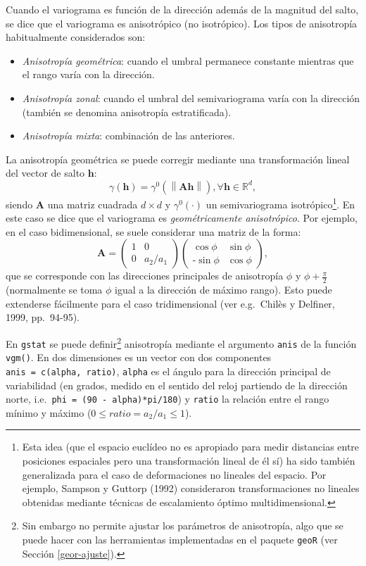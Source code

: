 \documentclass[
]{book}
\providecommand{\tightlist}{%
  \setlength{\itemsep}{0pt}\setlength{\parskip}{0pt}}
\theoremstyle{break}
\theoremstyle{definition}
\theoremstyle{definition}
\theoremstyle{definition}
\theoremstyle{definition}
\theoremstyle{remark}
\begin{document}
Cuando el variograma es función de la dirección además de la magnitud del salto, se dice que el variograma es anisotrópico (no isotrópico).
Los tipos de anisotropía habitualmente considerados son:

\begin{itemize}
\tightlist
\item
  \emph{Anisotropía geométrica}: cuando el umbral permanece constante mientras que el rango varía con la dirección.
\item
  \emph{Anisotropía zonal}: cuando el umbral del semivariograma varía con la dirección (también se denomina anisotropía estratificada).
\item
  \emph{Anisotropía mixta}: combinación de las anteriores.
\end{itemize}

La anisotropía geométrica se puede corregir mediante una transformación lineal del vector de salto \(\mathbf{h}\):
\[\gamma(\mathbf{h})=\gamma^{0} \left( \left\| \mathbf{A}\mathbf{h}\right\| \right) ,\forall \mathbf{h}\in \mathbb{R}^{d},\]
siendo \(\mathbf{A}\) una matriz cuadrada \(d\times d\) y \(\gamma^{0} (\cdot)\) un semivariograma isotrópico\footnote{Esta idea (que el espacio euclídeo no es apropiado para medir distancias entre posiciones espaciales pero una transformación lineal de él sí) ha sido también generalizada para el caso de deformaciones no lineales del espacio. Por ejemplo, Sampson y Guttorp (1992) consideraron transformaciones no lineales obtenidas mediante técnicas de escalamiento óptimo multidimensional.}.
En este caso se dice que el variograma es \emph{geométricamente anisotrópico}.
Por ejemplo, en el caso bidimensional, se suele considerar una matriz de la forma:
\[\mathbf{A}=\left( 
\begin{array}{cc}
1  & 0 \\
0 & a_2/a_1 
\end{array}
\right) \left( 
\begin{array}{cc}
\cos \phi  & \sin\phi  \\
\text{-} \sin\phi  & \cos \phi 
\end{array}
\right),\]
que se corresponde con las direcciones principales de anisotropía \(\phi\) y \(\phi + \frac{\pi }{\text{2}}\) (normalmente se toma \(\phi\) igual a la dirección de máximo rango).
Esto puede extenderse fácilmente para el caso tridimensional (ver e.g.~Chilès y Delfiner, 1999, pp.~94-95).

En \texttt{gstat} se puede definir\footnote{Sin embargo no permite ajustar los parámetros de anisotropía, algo que se puede hacer con las herramientas implementadas en el paquete \texttt{geoR} (ver Sección \ref{geor-ajuste}).} anisotropía mediante el argumento \texttt{anis} de la función \texttt{vgm()}.
En dos dimensiones es un vector con dos componentes \texttt{anis\ =\ c(alpha,\ ratio)}, \texttt{alpha} es el ángulo para la dirección principal de variabilidad (en grados, medido en el sentido del reloj partiendo de la dirección norte, i.e.~\texttt{phi\ =\ (90\ -\ alpha)*pi/180}) y \texttt{ratio} la relación entre el rango mínimo y máximo (\(0 \leq ratio = a_2/a_1 \leq 1\)).
\end{document}
